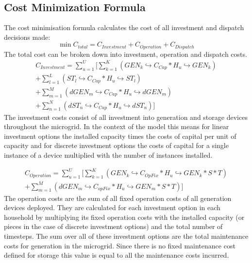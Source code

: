 \documentclass[
	11pt,								%
	DIV10,								%
	a4paper,         					%
	oneside,							%
	headheight=20pt,					%
	footheight=20pt,					%
    parskip=full,						%
    listof=totoc,						%
	bibliography=totoc,					%
	index=totoc,						%
]{scrartcl}
\begin{document}
\subsection{Cost Minimization Formula}
The cost minimisation formula calculates the cost of all investment and dispatch decisions made:
\begin{equation}
	\min C_{total} = C_{Investment} + C_{Operation} + C_{Dispatch}
\end{equation}
The total cost can be broken down into investment, operation and dispatch costs. 
\begin{equation}
	\begin{split}
		C_{Investment} = \sum_{u=1}^{U}[\sum_{k=1}^K{(GEN_k\hookrightarrow  C_{Cap} * H_u\hookrightarrow  GEN_k)}\\
		+ \sum_{l=1}^L{(ST_l\hookrightarrow  C_{Cap} * H_u\hookrightarrow  ST_l)}\\
		+ \sum_{m=1}^M{(dGEN_m\hookrightarrow  C_{Cap} * H_u\hookrightarrow  dGEN_m)}\\
		+ \sum_{n=1}^N{(dST_n\hookrightarrow  C_{Cap} * H_u\hookrightarrow  dST_n)}]
	\end{split}
\end{equation}
The investment costs consist of all investment into generation and storage devices throughout the microgrid. In the context of the model this means for linear investment options the installed capacity times the costs of capital per unit of capacity and for discrete investment options the costs of capital for a single instance of a device multiplied with the number of instances installed.

\begin{equation}
	\begin{split}
		C_{Operation} = \sum_{u=1}^{U}[\sum_{k=1}^{K}(GEN_k\hookrightarrow  C_{OpFix} * H_u \hookrightarrow GEN_k * S * T)\\
	 	+ \sum_{m=1}^{M}(dGEN_m\hookrightarrow  C_{opFix} * H_u \hookrightarrow GEN_m * S * T)]
	\end{split}
\end{equation}
The operation costs are the sum of all fixed operation costs of all generation devices deployed. They are calculated for each investment option in each household by multiplying its fixed operation costs with the installed capacity (or pieces in the case of discrete investment options) and the total number of timesteps. The sum over all of these investment options are the total maintenance costs for generation in the microgrid. Since there is no fixed maintenance cost defined for storage this value is equal to all the maintenance costs incurred.
\end{document}
